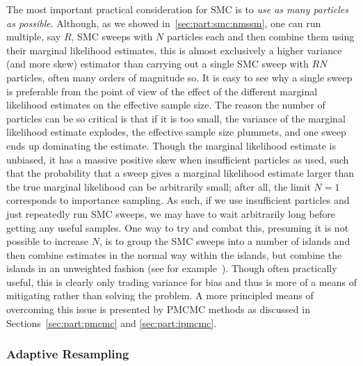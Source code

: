 The most important practical consideration for SMC is to
\emph{use as many particles as possible}.  Although, as we showed in~\ref{sec:part:smc:nmssm},
one can run multiple, say $R$, SMC sweeps with $N$ particles each and then combine them using their marginal likelihood estimates, this
is almost exclusively a higher variance (and more skew) estimator than carrying out a single SMC sweep
with $RN$ particles, often many orders of magnitude so.  It is easy to see why a single sweep is preferable
from the point of view of the effect of the different marginal likelihood estimates on the effective sample size.
The reason the number of particles can be so critical is that if it is too small, the variance of the marginal likelihood
estimate explodes, the effective sample size plummets, and one sweep ends up dominating the estimate.  Though the marginal 
likelihood estimate is unbiased, it has a massive positive skew when insufficient particles as used, such that the 
probability that a
sweep gives a marginal likelihood estimate larger than the true marginal likelihood can be arbitrarily small;
after all, the limit $N=1$ corresponds to importance sampling.  As such, if we use insufficient particles and just
repeatedly run SMC sweeps, we may have to wait arbitrarily long before getting any useful samples.  One way 
to try and combat this, presuming it is not possible to increase $N$, is to group the SMC sweeps into a number
of islands and then combine estimates in the normal way within the islands, but combine the islands in
an unweighted fashion (see for example~\cite{lakshminarayanan2013top}).  Though often practically useful, this
is clearly only trading variance for bias and thus is more of a means of mitigating rather than solving the problem.
A more principled means of overcoming this issue is presented by PMCMC methods as discussed in Sections~\ref{sec:part:pmcmc} and \ref{sec:part:ipmcmc}.

\subsubsection{Adaptive Resampling}
\label{sec:part:smc:prat:ad-re}

